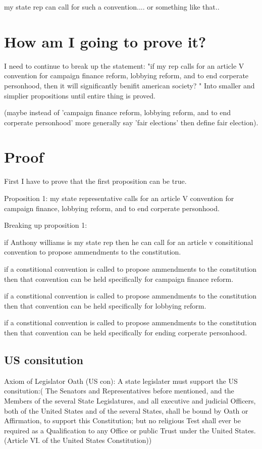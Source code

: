 \documentclass[11pt]{article} %
\begin{document}
\begin{enumerate}
my state rep can call for such a convention.... or something like that.. 

\section{How am I going to prove it?}

I need to continue to break up the statement: "if my rep calls for an article V convention for campaign finance reform, lobbying reform, and to end corperate personhood,  then it will significantly benifit american society? " Into smaller and simplier propositions until entire thing is proved.

(maybe instead of 'campaign finance reform, lobbying reform, and to end corperate personhood' more generally say 'fair elections' then define fair election). 

\section{Proof}

First I have to prove that the first proposition can be true.

Proposition 1: my state representative calls for an article V convention for campaign finance, lobbying reform, and to end corperate personhood.

Breaking up proposition 1:

if Anthony williams is my state rep then he can call for an article v consititional convention to propose ammendments to the constitution.

if a constitional convention is called to propose ammendments to the constitution then that convention can be held specifically for campaign finance reform.

if a constitional convention is called to propose ammendments to the constitution then that convention can be held specifically for lobbying reform.

if a constitional convention is called to propose ammendments to the constitution then that convention can be held specifically for ending corperate personhood.

\subsection{US consitution}

Axiom of  Legislator Oath (US con):  A state legislater must support the US consitution:( The Senators and Representatives before mentioned, and the Members of the several State Legislatures, and all executive and judicial Officers, both of the United States and of the several States, shall be bound by Oath or Affirmation, to support this Constitution; but no religious Test shall ever be required as a Qualification to any Office or public Trust under the United States. (Article VI. of the United States Constitution))


\end{enumerate}
\end{document}
